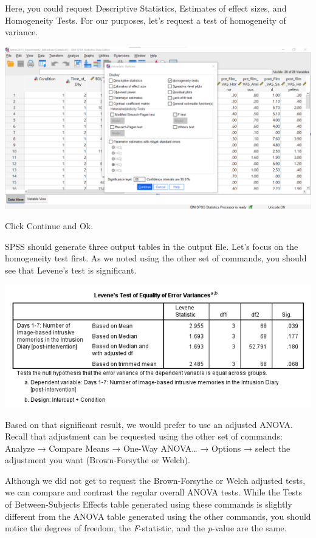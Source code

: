 \documentclass[
]{book}
\begin{document}
Here, you could request Descriptive Statistics, Estimates of effect sizes, and Homogeneity Tests. For our purposes, let's request a test of homogeneity of variance.

\includegraphics{img/8.6.6.38.png}

Click {Continue} and {Ok}.

SPSS should generate three output tables in the output file. Let's focus on the homogeneity test first. As we noted using the other set of commands, you should see that Levene's test is significant.

\includegraphics{img/8.6.6.39.png}

Based on that significant result, we would prefer to use an adjusted ANOVA. Recall that adjustment can be requested using the other set of commands: {Analyze} → {Compare Means} → {One-Way ANOVA\ldots{}} → {Options} → select the adjustment you want (Brown-Forsythe or Welch).

Although we did not get to request the Brown-Forsythe or Welch adjusted tests, we can compare and contrast the regular overall ANOVA tests. While the Tests of Between-Subjects Effects table generated using these commands is slightly different from the ANOVA table generated using the other commands, you should notice the degrees of freedom, the \emph{F}-statistic, and the \emph{p}-value are the same.
\end{document}
